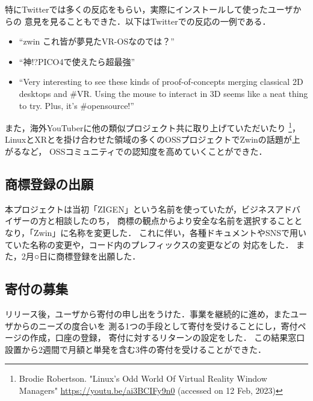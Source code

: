特にTwitterでは多くの反応をもらい，実際にインストールして使ったユーザからの
意見を見ることもできた．以下はTwitterでの反応の一例である．

\begin{itemize}
  \item ``zwin これ皆が夢見たVR-OSなのでは？''
  \item ``神!?PICO4で使えたら超最強''
  \item ``Very interesting to see these kinds of proof-of-concepts merging classical 2D desktops and \#VR. Using the mouse to interact in 3D seems like a neat thing to try. Plus, it's \#opensource!''
\end{itemize}

また，海外YouTuberに他の類似プロジェクト共に取り上げていただいたり
\footnote{Brodie Robertson. "Linux's Odd World Of Virtual Reality Window Managers" \url{https://youtu.be/ai3BCIFy9n0} (accessed on 12 Feb, 2023)}，
LinuxとXRとを掛け合わせた領域の多くのOSSプロジェクトでZwinの話題が上がるなど，
OSSコミュニティでの認知度を高めていくことができた．


\subsection{商標登録の出願}

本プロジェクトは当初「ZIGEN」という名前を使っていたが，ビジネスアドバイザーの方と相談したのち，
商標の観点からより安全な名前を選択することとなり，「Zwin」に名称を変更した．
これに伴い，各種ドキュメントやSNSで用いていた名称の変更や，コード内のプレフィックスの変更などの
対応をした．
また，2月○日に商標登録を出願した．


\subsection{寄付の募集}

リリース後，ユーザから寄付の申し出をうけた．事業を継続的に進め，またユーザからのニーズの度合いを
測る1つの手段として寄付を受けることにし，寄付ページの作成，口座の登録，
寄付に対するリターンの設定をした．
この結果窓口設置から2週間で月額と単発を含む3件の寄付を受けることができた．

